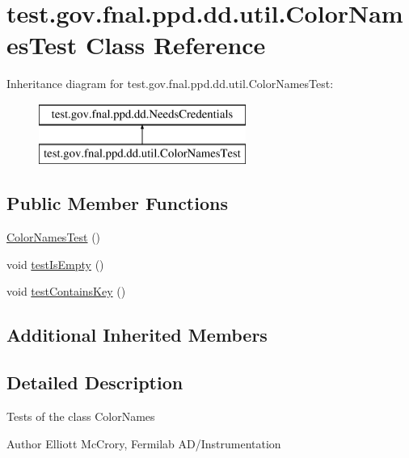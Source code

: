 \hypertarget{classtest_1_1gov_1_1fnal_1_1ppd_1_1dd_1_1util_1_1ColorNamesTest}{\section{test.\-gov.\-fnal.\-ppd.\-dd.\-util.\-Color\-Names\-Test Class Reference}
\label{classtest_1_1gov_1_1fnal_1_1ppd_1_1dd_1_1util_1_1ColorNamesTest}
}
Inheritance diagram for test.\-gov.\-fnal.\-ppd.\-dd.\-util.\-Color\-Names\-Test\-:\begin{figure}[H]
\begin{center}
\leavevmode
\includegraphics[height=2.000000cm]{classtest_1_1gov_1_1fnal_1_1ppd_1_1dd_1_1util_1_1ColorNamesTest}
\end{center}
\end{figure}
\subsection*{Public Member Functions}
\begin{DoxyCompactItemize}
\item 
\hyperlink{classtest_1_1gov_1_1fnal_1_1ppd_1_1dd_1_1util_1_1ColorNamesTest_a62dd90da3b7f55d614a1d0894738aeeb}{Color\-Names\-Test} ()
\item 
void \hyperlink{classtest_1_1gov_1_1fnal_1_1ppd_1_1dd_1_1util_1_1ColorNamesTest_aa399681fb14a75ae3c15495c64517128}{test\-Is\-Empty} ()
\item 
void \hyperlink{classtest_1_1gov_1_1fnal_1_1ppd_1_1dd_1_1util_1_1ColorNamesTest_a07a7f6fc63284f4f6eda2668cbf0e1e7}{test\-Contains\-Key} ()
\end{DoxyCompactItemize}
\subsection*{Additional Inherited Members}


\subsection{Detailed Description}
Tests of the class Color\-Names

\begin{DoxyAuthor}{Author}
Elliott Mc\-Crory, Fermilab A\-D/\-Instrumentation 
\end{DoxyAuthor}


